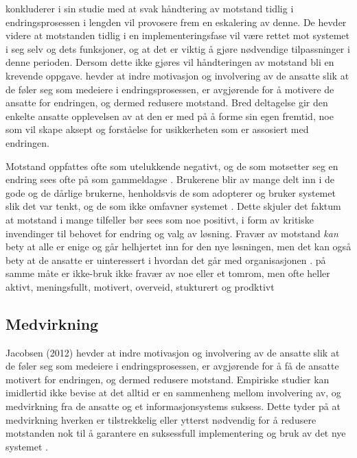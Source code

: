 \noindent
\citet{Lapointe05} konkluderer i sin studie med at svak håndtering av motstand tidlig i endringsprosessen i lengden vil provosere frem en eskalering av denne. De hevder videre at motstanden tidlig i en implementeringsfase vil være rettet mot systemet i seg selv og dets funksjoner, og at det er viktig å gjøre nødvendige tilpassninger i denne perioden. Dersom dette ikke gjøres vil håndteringen av motstand bli en krevende oppgave. \citet{Jacobsen12} hevder at indre motivasjon og involvering av de ansatte slik at de føler seg som medeiere i endringsprosessen, er avgjørende for å motivere de ansatte for endringen, og dermed redusere motstand. Bred deltagelse gir den enkelte ansatte opplevelsen av at den er med på å forme sin egen fremtid, noe som vil skape aksept og forståelse for usikkerheten som er assosiert med endringen.

\noindent
Motstand oppfattes ofte som utelukkende negativt, og de som motsetter seg en endring sees ofte på som gammeldagse \citep{Jacobsen12}. Brukerene blir av mange delt inn i de gode og de dårlige brukerne, henholdsvis de som adopterer og bruker systemet slik det var tenkt, og de som ikke omfavner systemet \citep{Satchell09}. Dette skjuler det faktum at motstand i mange tilfeller bør sees som noe positivt, i form av kritiske invendinger til behovet for endring og valg av løsning. Fravær av motstand \emph{kan} bety at alle er enige og går helhjertet inn for den nye løsningen, men det kan også bety at de ansatte er uinteressert i hvordan det går med organisasjonen \citep{Jacobsen12}. på samme måte er ikke-bruk ikke fravær av noe eller et tomrom, men ofte heller aktivt, meningsfullt, motivert, overveid, stukturert og prodktivt \citep{Satchell09}

\subsection{Medvirkning}
\label{sec:medvirkning}
Jacobsen (2012) hevder at indre motivasjon og involvering av de ansatte slik at de føler seg som medeiere i endringsprosessen, er avgjørende for å få de ansatte motivert for endringen, og dermed redusere motstand.
Empiriske studier kan imidlertid ikke bevise at det alltid er en sammenheng mellom involvering av, og medvirkning fra de ansatte og et informasjonsystems suksess. Dette tyder på at medvirkning hverken er tilstrekkelig eller ytterst nødvendig for å redusere motstanden nok til å garantere en suksessfull implementering og bruk av det nye systemet \citep{Cavaye95}. 